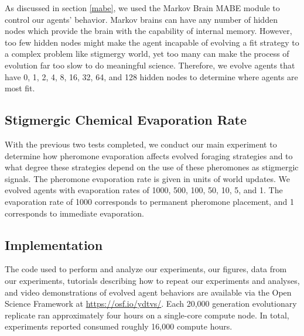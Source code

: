 As discussed in section \ref{mabe}, we used the Markov Brain MABE module to control our agents’ behavior. Markov brains can have any number of hidden nodes which provide the brain with the capability of internal memory. However, too few hidden nodes might make the agent incapable of evolving a fit strategy to a complex problem like stigmergy world, yet too many can make the process of evolution far too slow to do meaningful science. Therefore, we evolve agents that have 0, 1, 2, 4, 8, 16, 32, 64, and 128 hidden nodes to determine where agents are most fit.

\subsection*{Stigmergic Chemical Evaporation Rate}

With the previous two tests completed, we conduct our main experiment to determine how pheromone evaporation affects evolved foraging strategies and to what degree these strategies depend on the use of these pheromones as stigmergic signals. The pheromone evaporation rate is given in units of world updates. We evolved agents with evaporation rates of 1000, 500, 100, 50, 10, 5, and 1. The evaporation rate of 1000 corresponds to permanent pheromone placement, and 1 corresponds to immediate evaporation.

\subsection*{Implementation}

The code used to perform and analyze our experiments, our figures, data from our experiments, tutorials describing how to repeat our experiments and analyses, and video demonstrations of evolved agent behaviors are available via the Open Science Framework at \url{https://osf.io/ydtvs/}.
Each 20,000 generation evolutionary replicate ran approximately four hours on a single-core compute node.
In total, experiments reported consumed roughly 16,000 compute hours.
